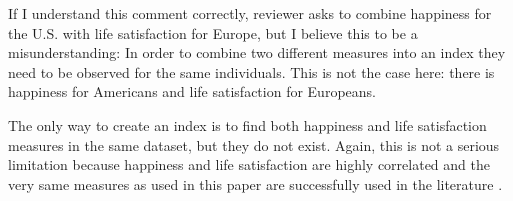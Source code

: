  If I understand this comment correctly, reviewer asks to combine happiness for the
U.S. with life satisfaction for Europe, but I believe this to be a misunderstanding: In order to
combine two different  measures into an index they need to be observed for the same
 individuals. This is not the case here: there is happiness for Americans and life satisfaction for Europeans.

\noindent The only way to create an index is to find both happiness and life satisfaction measures in the same
dataset, but they do not
exist. Again, this is not a serious limitation because happiness and life satisfaction
are highly correlated and the very same measures as used in this paper are successfully used in the
literature  \citep{alesina03, stevenson09w}.

